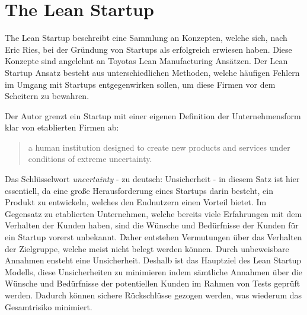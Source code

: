 \section{The Lean Startup}
\label{sec:LeanStartup}
The Lean Startup beschreibt eine Sammlung an Konzepten, welche sich, nach Eric Ries, bei der Gründung von Startups als erfolgreich erwiesen haben. Diese Konzepte sind angelehnt an Toyotas Lean Manufacturing Ansätzen. Der Lean Startup Ansatz besteht aus unterschiedlichen Methoden, welche häufigen Fehlern im Umgang mit Startups entgegenwirken sollen, um diese Firmen vor dem Scheitern zu bewahren.

Der Autor grenzt ein Startup mit einer eigenen Definition der Unternehmensform klar von etablierten Firmen ab:
\begin{quote}
a human institution designed to create new products and services under conditions of extreme uncertainty. \cite{TheLeanStartup}
\end{quote}
Das Schlüsselwort \textit{uncertainty} - zu deutsch: Unsicherheit - in diesem Satz ist hier essentiell, da eine große Herausforderung eines Startups darin besteht, ein Produkt zu entwickeln, welches den Endnutzern einen Vorteil bietet. Im Gegensatz zu etablierten Unternehmen, welche bereits viele Erfahrungen mit dem Verhalten der Kunden haben, sind die Wünsche und Bedürfnisse der Kunden für ein Startup vorerst unbekannt. Daher entstehen Vermutungen über das Verhalten der Zielgruppe, welche meist nicht belegt werden können. Durch unbeweisbare Annahmen ensteht eine Unsicherheit. Deshalb ist das Hauptziel des Lean Startup Modells, diese Unsicherheiten zu minimieren indem sämtliche Annahmen über die Wünsche und Bedürfnisse der potentiellen Kunden im Rahmen von Tests geprüft werden. Dadurch können sichere Rückschlüsse gezogen werden, was wiederum das Gesamtrisiko minimiert.

